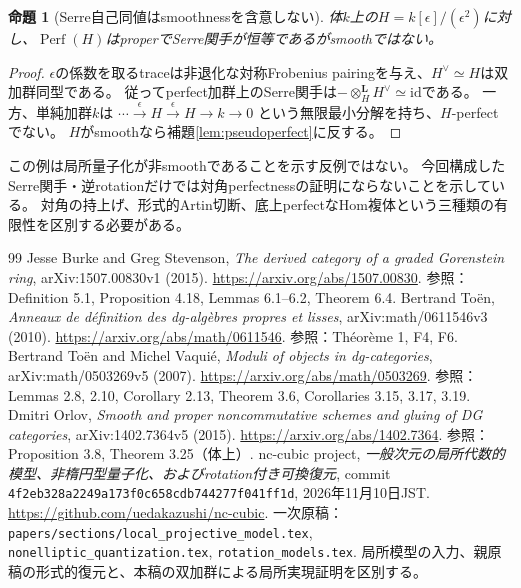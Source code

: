 \documentclass[a4paper,10pt]{ltjsarticle}
\newtheorem{proposition}[theorem]{命題}
\theoremstyle{definition}
\theoremstyle{remark}
\newcommand{\Perf}{\operatorname{Perf}}
\newcommand{\otL}{\otimes^{\mathbf L}}
\begin{document}
\begin{proposition}[Serre自己同値はsmoothnessを含意しない]\label{prop:warning}
体$k$上の$H=k[\epsilon]/(\epsilon^2)$に対し、$\Perf(H)$はproperでSerre関手が恒等であるがsmoothではない。
\end{proposition}
\begin{proof}
$\epsilon$の係数を取るtraceは非退化な対称Frobenius pairingを与え、$H^\vee\simeq H$は双加群同型である。
従ってperfect加群上のSerre関手は$-\otL_HH^\vee\simeq\mathrm{id}$である。
一方、単純加群$k$は
$\cdots\xrightarrow{\epsilon}H\xrightarrow{\epsilon}H\to k\to0$
という無限最小分解を持ち、$H$-perfectでない。
$H$がsmoothなら補題\ref{lem:pseudoperfect}に反する。
\end{proof}

この例は局所量子化が非smoothであることを示す反例ではない。
今回構成したSerre関手・逆rotationだけでは対角perfectnessの証明にならないことを示している。
対角の持上げ、形式的Artin切断、底上perfectなHom複体という三種類の有限性を区別する必要がある。

\begin{thebibliography}{99}
 Jesse Burke and Greg Stevenson,
\emph{The derived category of a graded Gorenstein ring},
arXiv:1507.00830v1 (2015).
\url{https://arxiv.org/abs/1507.00830}.
参照：Definition 5.1, Proposition 4.18, Lemmas 6.1--6.2, Theorem 6.4.
 Bertrand Toën,
\emph{Anneaux de définition des dg-algèbres propres et lisses},
arXiv:math/0611546v3 (2010).
\url{https://arxiv.org/abs/math/0611546}.
参照：Théorème 1, F4, F6.
 Bertrand Toën and Michel Vaquié,
\emph{Moduli of objects in dg-categories},
arXiv:math/0503269v5 (2007).
\url{https://arxiv.org/abs/math/0503269}.
参照：Lemmas 2.8, 2.10, Corollary 2.13, Theorem 3.6, Corollaries 3.15, 3.17, 3.19.
 Dmitri Orlov,
\emph{Smooth and proper noncommutative schemes and gluing of DG categories},
arXiv:1402.7364v5 (2015).
\url{https://arxiv.org/abs/1402.7364}.
参照：Proposition 3.8, Theorem 3.25（体上）.
 nc-cubic project,
\emph{一般次元の局所代数的模型、非楕円型量子化、およびrotation付き可換復元},
commit \texttt{4f2eb328a2249a173f0c658cdb744277f041ff1d}, 2026年11月10日JST.
\url{https://github.com/uedakazushi/nc-cubic}.
一次原稿：\texttt{papers/sections/local\_projective\_model.tex},
\texttt{nonelliptic\_quantization.tex}, \texttt{rotation\_models.tex}.
局所模型の入力、親原稿の形式的復元と、本稿の双加群による局所実現証明を区別する。

\end{thebibliography}
\end{document}
